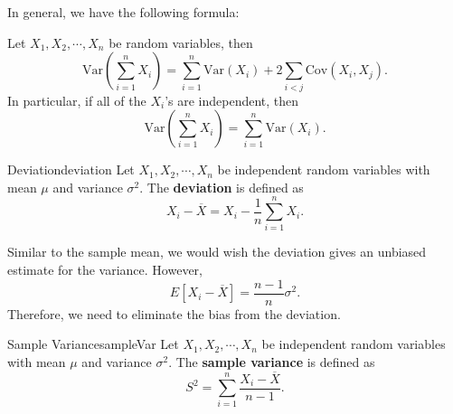\documentclass[math]{amznotes}
\theoremstyle{remark}
\begin{document}
In general, we have the following formula:
\begin{probox}{}{}
    Let $X_1, X_2, \cdots, X_n$ be random variables, then
    \begin{equation*}
        \mathrm{Var}\left(\sum_{i = 1}^{n}X_i\right) = \sum_{i = 1}^{n}\mathrm{Var}(X_i) + 2\sum_{i < j}\mathrm{Cov}(X_i, X_j).
    \end{equation*}
    In particular, if all of the $X_i$'s are independent, then
    \begin{equation*}
        \mathrm{Var}\left(\sum_{i = 1}^{n}X_i\right) = \sum_{i = 1}^{n}\mathrm{Var}(X_i).
    \end{equation*}
\end{probox}
\begin{dfnbox}{Deviation}{deviation}
    Let $X_1, X_2, \cdots, X_n$ be independent random variables with mean $\mu$ and variance $\sigma^2$. The {\color{red} \textbf{deviation}} is defined as
    \begin{equation*}
        X_i - \overline{X} = X_i - \frac{1}{n}\sum_{i = 1}^{n}X_i.
    \end{equation*}
\end{dfnbox}
Similar to the sample mean, we would wish the deviation gives an unbiased estimate for the variance. However, 
\begin{equation*}
    E\left[X_i - \overline{X}\right] = \frac{n - 1}{n}\sigma^2.
\end{equation*}
Therefore, we need to eliminate the bias from the deviation.
\begin{dfnbox}{Sample Variance}{sampleVar}
    Let $X_1, X_2, \cdots, X_n$ be independent random variables with mean $\mu$ and variance $\sigma^2$. The {\color{red} \textbf{sample variance}} is defined as
    \begin{equation*}
        S^2 = \sum_{i = 1}^{n}\frac{X_i - \overline{X}}{n - 1}.
    \end{equation*}
\end{dfnbox}
\end{document}
